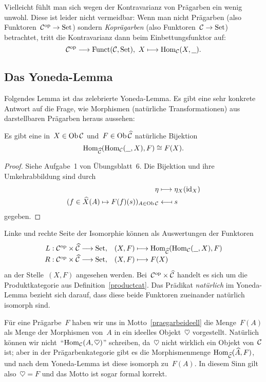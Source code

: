 \begin{bem}Vielleicht fühlt man sich wegen der Kontravarianz von Prägarben ein
wenig unwohl. Diese ist leider nicht vermeidbar: Wenn man nicht Prägarben (also
Funktoren~$\mathcal{C}^{\mathrm{op}} \to \mathrm{Set}$) sondern \emph{Koprägarben} (also Funktoren~$\mathcal{C} \to
\mathrm{Set}$) betrachtet, tritt die Kontravarianz dann beim Einbettungsfunktor auf:
\[ \mathcal{C}^{\mathrm{op}} \longrightarrow \mathrm{Funct}(\mathcal{C},\mathrm{Set}),\ X \longmapsto \mathrm{Hom}_{\mathcal{C}}(X,\underline{\ \ }).  \]
\end{bem}


\subsection{Das Yoneda-Lemma}

Folgendes Lemma ist das zelebrierte Yoneda-Lemma. Es gibt eine sehr konkrete
Antwort auf die Frage, wie Morphismen (natürliche Transformationen) aus
darstellbaren Prägarben heraus aussehen:

\begin{lemma}Es gibt eine in~$X \in \operatorname{Ob} \mathcal{C}$ und~$F \in \operatorname{Ob} \widehat {\mathcal{C}}$
natürliche Bijektion
\[ \mathrm{Hom}_{\widehat{\mathcal{C}}}(\mathrm{Hom}_{\mathcal{C}}(\underline{\ \ }, X), F) \cong F(X). \]
\end{lemma}
\begin{proof}Siehe Aufgabe~1 von Übungsblatt~6. Die Bijektion und ihre
Umkehrabbildung sind durch
\begin{align*}
 \eta &\longmapsto \eta_X(\mathrm{id}_X) \\
 (f \in \widehat X(A) \mapsto F(f)(s))_{A\in\operatorname{Ob}\mathcal{C}} &\longmapsfrom s
\end{align*}
gegeben.\end{proof}
Linke und rechte Seite der Isomorphie können als Auswertungen der Funktoren
\[ \renewcommand{\arraystretch}{1.3}\begin{array}{@{}rl@{}}
  L : \C^\op \times \widehat\C \longrightarrow \Set, &
  (X,F) \longmapsto \Hom_{\widehat\C}(\Hom_\C(\freist,X), F)
  \\
  R : \C^\op \times \widehat\C \longrightarrow \Set, &
  (X,F) \longmapsto F(X)
\end{array} \]
an der Stelle~$(X,F)$ angesehen werden. Bei~$\mathcal{C}^{\mathrm{op}} \times \widehat{\mathcal{C}}$ handelt
es sich um die Produktkategorie aus Definition~\ref{productcat}.
Das Prädikat \emph{natürlich} im Yoneda-Lemma bezieht
sich darauf, dass diese beide Funktoren zueinander natürlich isomorph sind.

\begin{bsp}Für eine Prägarbe~$F$ haben wir uns in
Motto~\ref{praegarbeideell} die Menge~$F(A)$ als Menge der Morphismen von~$A$
in ein ideelles Objekt~$\heartsuit$ vorgestellt. Natürlich können wir
nicht~"`$\mathrm{Hom}_{\mathcal{C}}(A,\heartsuit)$"' schreiben, da~$\heartsuit$ nicht wirklich ein
Objekt von~$\mathcal{C}$ ist; aber in der Prägarbenkategorie gibt es die Morphismenmenge
$\mathrm{Hom}_{\widehat{\mathcal{C}}}(\widehat A,F)$, und nach dem Yoneda-Lemma ist diese isomorph
zu~$F(A)$. In diesem Sinn gilt also~$\heartsuit = F$ und das Motto ist sogar formal
korrekt.\end{bsp}


